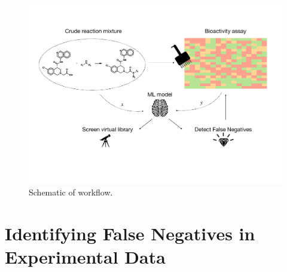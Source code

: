 
\begin{figure}
    \centering
             \includegraphics[width=\textwidth]{Chapters/Crude/Figs/schematic.pdf}
        \caption{Schematic of workflow.}
        \label{fig:schematic}
    \end{figure}

\section{Identifying False Negatives in Experimental Data}

